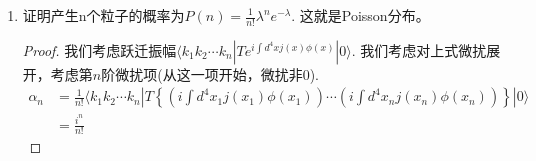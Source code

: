 \documentclass[a4paper]{article}
\newtheorem{proof}{答案}[section]
\begin{document}
\begin{enumerate}
\begin{proof}
        \begin{equation}
            \alpha_{2n+1}=\frac{1}{(2n+1)!}\times(2n+1)!!(-\lambda)^n\times i\tilde{j}(p)=\frac{i}{(2n)!!}(-\lambda)^n\tilde{j}(p)=\frac{i}{n!}(-\frac{\lambda}{2})^n\tilde{j}(p)
        \end{equation}
        所以$P(k)=|i\sum_{n}\frac{(-\lambda/2)^n}{n!}\tilde{j}(p)|^2=|\tilde{j}(p)|^2e^{-\lambda}$
    \end{proof}
    \item 证明产生n个粒子的概率为$P(n)=\frac{1}{n!}\lambda^n e^{-\lambda}$. 这就是Poisson分布。
    \begin{proof}
        我们考虑跃迁振幅$\langle k_1k_2\cdots k_n|T e^{i\int d^4x j(x)\phi(x)}|0\rangle$. 我们考虑对上式微扰展开，考虑第$n$阶微扰项(从这一项开始，微扰非$0$).
        \begin{equation}
            \begin{split}
                \alpha_n&=\frac{1}{n!}\langle k_1k_2\cdots k_n|T\left\{\left(i\int d^4x_1 j(x_1)\phi(x_1)\right)\cdots\left(i\int d^4x_n j(x_n)\phi(x_n)\right)\right\}|0\rangle\\
                &=\frac{i^n}{n!}
            \end{split}
        \end{equation}
    \end{proof}
\end{enumerate}
\end{document}
